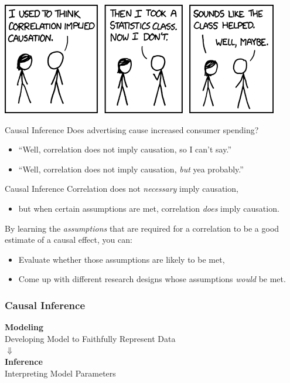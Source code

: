 \documentclass[11pt]{beamer}
\begin{document}
\begin{frame}[c]
  \centering
  \includegraphics[width=\textwidth]{xkcd_correlation_causation.png}
\end{frame}

\begin{frame}[c]{Causal Inference}
Does advertising cause increased consumer spending?
  \begin{itemize}
  \pause \item ``Well, correlation does not imply causation, so I can't say.''
  \pause \item ``Well, correlation does not imply causation, \emph{but} yea probably.''
\end{itemize}
\end{frame}

\begin{frame}[c]{Causal Inference}
Correlation does not \emph{necessary} imply causation, 
\begin{itemize}
  \pause \item  but when certain assumptions are met, correlation \emph{does} imply causation. 
\end{itemize} 
\vspace*{0.2cm}
\pause By learning the \emph{assumptions} that are required for a correlation to be a good estimate of a causal effect, you can:
\begin{itemize}
  \pause \item Evaluate whether those assumptions are likely to be met,
  \pause \item Come up with different research designs whose assumptions \emph{would} be met. 
\end{itemize}
\end{frame}

\begin{frame}[c]
  \frametitle{Causal Inference}
  \centering
  \textbf{Modeling} \\
  Developing Model to Faithfully Represent Data \\
  \vspace*{1cm}
  $\Downarrow$ \\
  \vspace*{1cm}
   \alert<2->{\textbf{Inference}} \\
  \alert<2->{Interpreting Model Parameters}
\end{frame}
\end{document}
